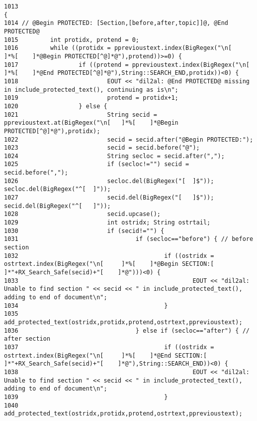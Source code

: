 \footnotesize\begin{verbatim}1013                                                                        {
1014 // @Begin PROTECTED: [Section,[before,after,topic]]@, @End PROTECTED@
1015         int protidx, protend = 0;
1016         while ((protidx = pprevioustext.index(BigRegex("\n[     ]*%[    ]*@Begin PROTECTED[^@]*@"),protend))>=0) {
1017                 if ((protend = pprevioustext.index(BigRegex("\n[        ]*%[    ]*@End PROTECTED[^@]*@"),String::SEARCH_END,protidx))<0) {
1018                         EOUT << "dil2al: @End PROTECTED@ missing in include_protected_text(), continuing as is\n";
1019                         protend = protidx+1;
1020                 } else {
1021                         String secid = pprevioustext.at(BigRegex("\n[   ]*%[    ]*@Begin PROTECTED[^@]*@"),protidx);
1022                         secid = secid.after("@Begin PROTECTED:");
1023                         secid = secid.before("@");
1024                         String secloc = secid.after(",");
1025                         if (secloc!="") secid = secid.before(",");
1026                         secloc.del(BigRegex("[  ]$")); secloc.del(BigRegex("^[  ]"));
1027                         secid.del(BigRegex("[   ]$")); secid.del(BigRegex("^[   ]"));
1028                         secid.upcase();
1029                         int ostridx; String ostrtail;
1030                         if (secid!="") {
1031                                 if (secloc=="before") { // before section
1032                                         if ((ostridx = ostrtext.index(BigRegex("\n[     ]*%[    ]*@Begin SECTION:[      ]*"+RX_Search_Safe(secid)+"[    ]*@")))<0) {
1033                                                 EOUT << "dil2al: Unable to find section " << secid << " in include_protected_text(), adding to end of document\n";
1034                                         }
1035                                         add_protected_text(ostridx,protidx,protend,ostrtext,pprevioustext);
1036                                 } else if (secloc=="after") { // after section
1037                                         if ((ostridx = ostrtext.index(BigRegex("\n[     ]*%[    ]*@End SECTION:[        ]*"+RX_Search_Safe(secid)+"[    ]*@"),String::SEARCH_END))<0) {
1038                                                 EOUT << "dil2al: Unable to find section " << secid << " in include_protected_text(), adding to end of document\n";
1039                                         }
1040                                         add_protected_text(ostridx,protidx,protend,ostrtext,pprevioustext);

\end{verbatim}
